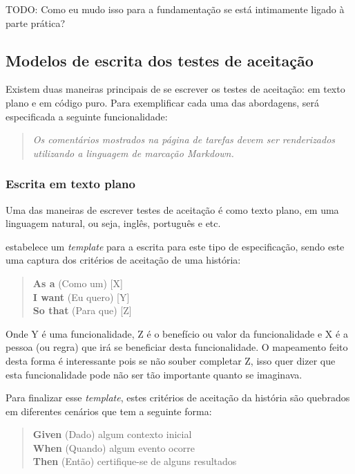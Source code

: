 
TODO: Como eu mudo isso para a fundamentação se está intimamente ligado à parte prática?

\subsection{Modelos de escrita dos testes de aceitação}
\label{sub:modelos_de_escrita_dos_testes_de_aceitacao}

Existem duas maneiras principais de se escrever os testes de aceitação: em texto plano e em código puro. Para exemplificar cada uma das abordagens, será especificada a seguinte funcionalidade:

\begin{quote}
\textit{Os comentários mostrados na página de tarefas devem ser renderizados utilizando a linguagem de marcação Markdown.}
\end{quote}

\subsubsection{Escrita em texto plano}
\label{ssub:escrita_em_texto_plano}

Uma das maneiras de escrever testes de aceitação é como texto plano, em uma linguagem natural, ou seja, inglês, português e etc.

 estabelece um \textit{template} para a escrita para este tipo de especificação, sendo este uma captura dos critérios de aceitação de uma história:

\begin{quote}
\textbf{As a} (Como um) [X]\\
\textbf{I want} (Eu quero) [Y]\\
\textbf{So that} (Para que) [Z]
\end{quote}

Onde Y é uma funcionalidade, Z é o benefício ou valor da funcionalidade e X é a pessoa (ou regra) que irá se beneficiar desta funcionalidade. O mapeamento feito desta forma é interessante pois se não souber completar Z, isso quer dizer que esta funcionalidade pode não ser tão importante quanto se imaginava.

Para finalizar esse \textit{template}, estes critérios de aceitação da história são quebrados em diferentes cenários que tem a seguinte forma:

\begin{quote}
\textbf{Given} (Dado) algum contexto inicial\\
\textbf{When} (Quando) algum evento ocorre\\
\textbf{Then} (Então) certifique-se de alguns resultados
\end{quote}

